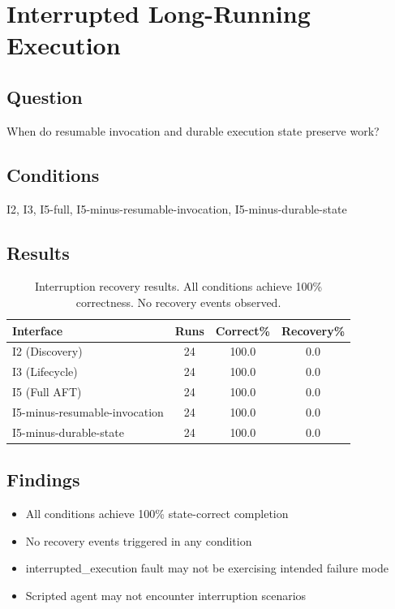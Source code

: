 
\section{Interrupted Long-Running Execution}

\subsection{Question}
When do resumable invocation and durable execution state preserve work?

\subsection{Conditions}
I2, I3, I5-full, I5-minus-resumable-invocation, I5-minus-durable-state

\subsection{Results}

\begin{table}[h]
\centering
\begin{tabular}{lccc}
\hline
\textbf{Interface} & \textbf{Runs} & \textbf{Correct\%} & \textbf{Recovery\%} \\
\hline
I2 (Discovery) & 24 & 100.0 & 0.0 \\
I3 (Lifecycle) & 24 & 100.0 & 0.0 \\
I5 (Full AFT) & 24 & 100.0 & 0.0 \\
I5-minus-resumable-invocation & 24 & 100.0 & 0.0 \\
I5-minus-durable-state & 24 & 100.0 & 0.0 \\
\hline
\end{tabular}
\caption{Interruption recovery results. All conditions achieve 100\% correctness. No recovery events observed.}
\label{tab:interruption_recovery}
\end{table}

\subsection{Findings}
\begin{itemize}
    \item All conditions achieve 100\% state-correct completion
    \item No recovery events triggered in any condition
    \item interrupted\_execution fault may not be exercising intended failure mode
    \item Scripted agent may not encounter interruption scenarios
\end{itemize}

